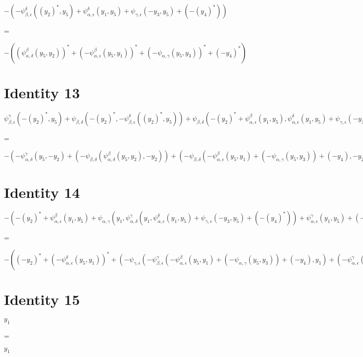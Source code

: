\documentclass[a4paper,landscape]{article}
\begin{document}
$ -(-\psi_{\beta,\epsilon}^\delta((y_2)^*,y_5)+\psi_{\alpha,\epsilon}^\delta(y_1,y_5)+\psi_{\gamma,\epsilon}(-y_3,y_5)+(-(y_4)^*)) $

\addvspace{0.5cm}
=

\addvspace{0.5cm}
$ -((\psi_{\alpha,\delta}^\beta(y_5,y_2))^*+(-\psi_{\alpha,\epsilon}^\beta(y_5,y_1))^*+(-\psi_{\alpha,\gamma}(y_5,y_3))^*+(-y_4)^*) $

\section*{Identity 13}

$ \psi_{\beta,\epsilon}^\gamma(-(y_2)^*,y_5)+\psi_{\beta,\delta}(-(y_2)^*,-\psi_{\beta,\epsilon}^\delta((y_2)^*,y_5))+\psi_{\beta,\delta}(-(y_2)^*+\psi_{\alpha,\epsilon}^\beta(y_1,y_5),\psi_{\alpha,\epsilon}^\delta(y_1,y_5)+\psi_{\gamma,\epsilon}(-y_3,y_5)+(-(y_4)^*))+\psi_{\alpha,\delta}^\gamma(y_1,\psi_{\alpha,\epsilon}^\delta(y_1,y_5)+\psi_{\gamma,\epsilon}(-y_3,y_5)+(-(y_4)^*))+\psi_{\alpha,\epsilon}^\gamma(y_1,y_5)+(-y_3) $

\addvspace{0.5cm}
=

\addvspace{0.5cm}
$ -(-\psi_{\alpha,\delta}^\gamma(y_5,-y_2)+(-\psi_{\beta,\delta}(\psi_{\alpha,\delta}^\beta(y_5,y_2),-y_2))+(-\psi_{\beta,\delta}(-\psi_{\alpha,\epsilon}^\beta(y_5,y_1)+(-\psi_{\alpha,\gamma}(y_5,y_3))+(-y_4),-y_2+(-\psi_{\alpha,\epsilon}^\delta(y_5,y_1))))+(-\psi_{\beta,\epsilon}^\gamma(-\psi_{\alpha,\epsilon}^\beta(y_5,y_1)+(-\psi_{\alpha,\gamma}(y_5,y_3))+(-y_4),y_1))+(-\psi_{\alpha,\epsilon}^\gamma(y_5,y_1))+y_3) $

\section*{Identity 14}

$ -(-(y_2)^*+\psi_{\alpha,\epsilon}^\beta(y_1,y_5)+\psi_{\alpha,\gamma}(y_1,\psi_{\alpha,\delta}^\gamma(y_1,\psi_{\alpha,\epsilon}^\delta(y_1,y_5)+\psi_{\gamma,\epsilon}(-y_3,y_5)+(-(y_4)^*))+\psi_{\alpha,\epsilon}^\gamma(y_1,y_5)+(-y_3))+\psi_{\alpha,\delta}^\beta(y_1,\psi_{\alpha,\epsilon}^\delta(y_1,y_5)+\psi_{\gamma,\epsilon}(-y_3,y_5)+(-(y_4)^*))) $

\addvspace{0.5cm}
=

\addvspace{0.5cm}
$ -((-y_2)^*+(-\psi_{\alpha,\epsilon}^\delta(y_5,y_1))^*+(-\psi_{\gamma,\epsilon}(-\psi_{\beta,\epsilon}^\gamma(-\psi_{\alpha,\epsilon}^\beta(y_5,y_1)+(-\psi_{\alpha,\gamma}(y_5,y_3))+(-y_4),y_1)+(-\psi_{\alpha,\epsilon}^\gamma(y_5,y_1))+y_3,y_1))^*+(-\psi_{\beta,\epsilon}^\delta(-\psi_{\alpha,\epsilon}^\beta(y_5,y_1)+(-\psi_{\alpha,\gamma}(y_5,y_3))+(-y_4),y_1))^*) $

\section*{Identity 15}

$ y_1 $

\addvspace{0.5cm}
=

\addvspace{0.5cm}
$ y_1 $
\end{document}

